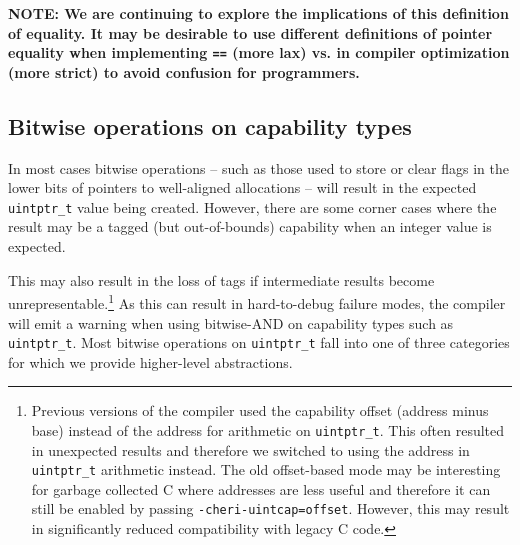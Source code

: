 \documentclass[11pt]{article}
\newcommand{\uintptr}{\texttt{uintptr\_t}\xspace}
\newcommand{\note}[2]{{\color{blue}[ Note: #1 - #2]}}
\renewcommand{\note}[2]{}
\newcommand{\arnote}[1]{\note{#1}{Alex R.}}
\begin{document}
\textbf{NOTE:
We are continuing to explore the implications of this definition of equality.
It may be desirable to use different definitions of pointer equality when
implementing \texttt{==} (more lax) vs. in compiler optimization (more strict)
to avoid confusion for programmers.}

%

\arnote{We might want to mention the effect of capability ordering: untagged
always orders before tagged. This causes the use of -1 as a sentinel value (e.g.
in ngxinx) to break.}

\note{I think we should mention the \texttt{X + offset < Y} vs.\@ \texttt{Y - X
> offset} issue here, even if we don't get into the full mess of pointer
comparisons, just to say that \texttt{X + offset} might result in an un-tagged
pointer.}{nwf}

\subsection{Bitwise operations on capability types}

In most cases bitwise operations -- such as those used to store or clear flags
in the lower bits of pointers to well-aligned allocations -- will result in the expected \uintptr value being created.
However, there are some corner cases where the result may be a tagged (but out-of-bounds)
capability when an integer value is expected.
\arnote{TODO: add an example. Maybe the mutex example checking low pointer bits + some alignment checks?}
This may also result in the loss of tags if intermediate results become unrepresentable.\footnote{%
Previous versions of the compiler used the capability offset (address minus base) instead
of the address for arithmetic on \uintptr.
This often resulted in unexpected results and therefore we switched to using
the address in \uintptr arithmetic instead.
The old offset-based mode may be interesting for garbage collected C where
addresses are less useful and therefore it can still be enabled by
passing \texttt{-cheri-uintcap=offset}.
However, this may result in significantly reduced compatibility with legacy C code.
}
As this can result in hard-to-debug failure modes, the compiler will emit a
warning when using bitwise-AND on capability types such as \uintptr.
Most bitwise operations on \uintptr fall into one of three categories for which we provide
higher-level abstractions.
\end{document}
